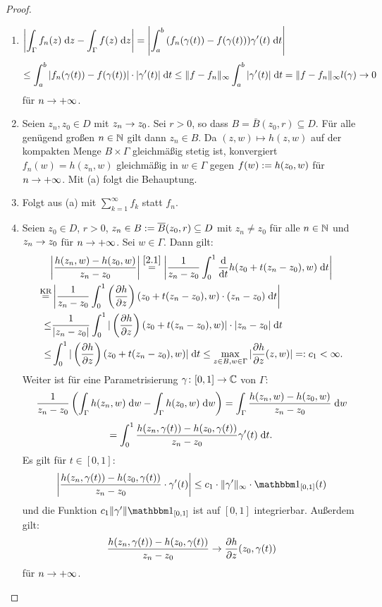 \documentclass[a4paper,twoside,DIV15,BCOR12mm]{scrbook}
\begin{document}
\begin{proof}\begin{enumerate}
\item $\displaystyle\left|\int_{\Gamma}^{}{f_n(z)}\;\mathrm{d} z-\int_{\Gamma}^{}{f(z)}\;\mathrm{d} z\right| = \left|\int_{a}^{b}{(f_n(\gamma(t))-f(\gamma(t)))\gamma^\prime(t)}\;\mathrm{d} t\right|$
\[\leq\int_{a}^{b}{|f_n(\gamma(t))-f(\gamma(t))|\cdot|\gamma^\prime(t)|}\;\mathrm{d} t\leq\|f-f_n\|_\infty\int_{a}^{b}{|\gamma^\prime(t)|}\;\mathrm{d} t = \|f-f_n\|_\infty l(\gamma)\rightarrow 0\]
für $n\rightarrow+\infty$.

\item Seien $z_n,z_0\in D$ mit $z_n\rightarrow z_0$. Sei $r>0$, so dass $B=\bar{B}(z_0,r)\subseteq D$. Für alle genügend großen $n\in\mathbb{N}$ gilt dann $z_n\in B$. Da $(z,w)\mapsto h(z,w)$ auf der kompakten Menge $B\times\Gamma$ gleichmäßig stetig ist, konvergiert $f_n(w) = h(z_n,w)$ gleichmäßig in $w\in\Gamma$ gegen $f(w):= h(z_0,w)$ für $n\rightarrow+\infty$. Mit (a) folgt die Behauptung.

\item Folgt aus (a) mit $\displaystyle\sum_{k=1}^\infty f_k$ statt $f_n$.

\item Seien $z_0\in D$, $r>0$, $z_n\in B:= \overline{B}(z_0,r)\subseteq D$ mit $z_n\neq z_0$ für alle $n\in\mathbb{N}$ und $z_n\rightarrow z_0$ für $n\rightarrow+\infty$. Sei $w\in\Gamma$. Dann gilt:
\begin{gather*}
\left|\frac{h(z_n,w)-h(z_0,w)}{z_n-z_0}\right| \overset{\eqref{2.1}}{=}\left|\frac{1}{z_n-z_0}\int_{0}^{1}{\frac{\mathrm{d}}{\mathrm{d}t}h(z_0+t(z_n-z_0),w)}\;\mathrm{d} t\right|\\
\begin{split}
\overset{\text{KR}}{=}&\left|\frac{1}{z_n-z_0}\int_{0}^{1}{\left(\frac{\partial h}{\partial z}\right)(z_0+t(z_n-z_0),w)\cdot(z_n-z_0)}\;\mathrm{d} t\right|\\ 
\leq& \frac{1}{|z_n-z_0|}\int_{0}^{1}{|\left(\frac{\partial h}{\partial z}\right)(z_0+t(z_n-z_0),w)|\cdot|z_n-z_0|}\;\mathrm{d} t\\
\leq&\int_{0}^{1}{|\left(\frac{\partial h}{\partial z}\right)(z_0+t(z_n-z_0),w)|}\;\mathrm{d} t \leq \max_{z\in B,w\in\Gamma} |\frac{\partial h}{\partial z}(z,w)| =: c_1 < \infty.
\end{split}\end{gather*}
Weiter ist für eine Parametrisierung $\gamma\colon[0,1]\rightarrow\mathbb{C}$ von $\Gamma$:
\[\frac{1}{z_n-z_0}\left(\int_{\Gamma}^{}{h(z_n,w)}\;\mathrm{d} w-\int_{\Gamma}^{}{h(z_0,w)}\;\mathrm{d} w\right) = \int_{\Gamma}^{}{\frac{h(z_n,w)-h(z_0,w)}{z_n-z_0}}\;\mathrm{d} w\]
\[=\int_{0}^{1}{\frac{h(z_n,\gamma(t))-h(z_0,\gamma(t))}{z_n-z_0}\gamma^\prime(t)}\;\mathrm{d} t.\]
Es gilt für $t\in[0,1]$:
\[\left|\frac{h(z_n,\gamma(t))-h(z_0,\gamma(t))}{z_n-z_0}\cdot\gamma^\prime(t)\right| \leq c_1\cdot\|\gamma^\prime\|_\infty\cdot\charfnkt{[0,1]}(t)\]
und die Funktion $c_1\|\gamma^\prime\|\charfnkt{[0,1]}$ ist auf $[0,1]$ integrierbar. Außerdem gilt:
\[\frac{h(z_n,\gamma(t))-h(z_0,\gamma(t))}{z_n-z_0}\rightarrow\frac{\partial h}{\partial z}(z_0,\gamma(t))\]
für $n\rightarrow+\infty$.


\end{enumerate}
\end{proof}
\end{document}

